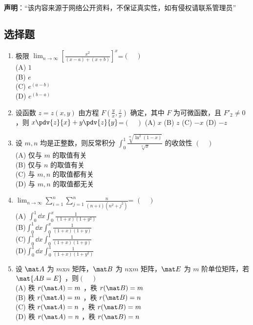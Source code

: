 
\textbf{声明}：“该内容来源于网络公开资料，不保证真实性，如有侵权请联系管理员”

\subsection{选择题}
\begin{enumerate}
\item 极限  $\displaystyle \lim_{n\to\infty}[\frac{x^2}{(x-a)+(x+b)}]^x$=$(\quad )$\\
(A) $1$\\
(B) $e$\\
(C) $e^(a-b)$\\
(D) $e^(b-a)$
\item  设函数 $z=z(x,y)$ 由方程 $\displaystyle F(\frac{y}{x},\frac{z}{x})$ 确定，其中 $F$ 为可微函数，且 $F'_2 \neq0$ ，则  $\displaystyle x \pdv{z}{x}+y\pdv{z}{y}$=$(\quad )$
(A)  $x$
(B)  $z$
(C) $-x$
(D)  $-z$
\item 设 $m,n$ 均是正整数，则反常积分 $\displaystyle \int_0^1 \frac{\sqrt[m]{\ln^2(1-x)}}{\sqrt[n]{x}}$ 的收敛性 $(\quad )$\\
(A) 仅与 $m$ 的取值有关\\
(B) 仅与 $n$ 的取值有关\\
(C)  与 $m,n$ 的取值都有关\\
(D)  与 $m,n$ 的取值都无关
\item $\displaystyle \lim_{n\to\infty} \sum_{i=1}^n \sum_{j=1}^n \frac{n}{(n+i)(n^2+j^2)}$= $(\quad )$\\
(A) $\displaystyle \int_{0}^{1}\dd{x}\int_{0}^{x} \frac{1}{(1+x)(1+y^2)}$\\
(B)$\displaystyle \int_{0}^{1}\dd{x}\int_{0}^{x} \frac{1}{(1+x)(1+y)}$\\
(C)$\displaystyle \int_{0}^{1}\dd{x}\int_{0}^{1} \frac{1}{(1+x)(1+y)}$\\
(D)$\displaystyle \int_{0}^{1}\dd{x}\int_{0}^{1} \frac{1}{(1+x)(1+y^2)}$
\item 设 $\mat A$ 为 $m$x$n$ 矩阵，$\mat B$  为 $n$x$m$  矩阵，$\mat E$  为  $m$ 阶单位矩阵，若 $\mat {AB=E}$ ，则$(\quad )$\\
(A) 秩 $r(\mat A)=m$ ，秩  $r(\mat  B)=m$ \\
(B) 秩 $r(\mat A)=m$ ，秩  $r( \mat B)=n$ \\
(C) 秩 $r(\mat A)=n$ ，秩  $r( \mat B)=m$ \\
(D) 秩 $r(\mat A)=n$ ，秩  $r(\mat B)=n$ \\

\end{enumerate}
